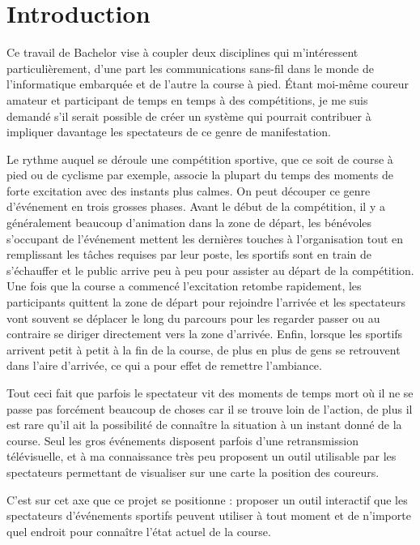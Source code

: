 \chapter{Introduction}

Ce travail de Bachelor vise à coupler deux disciplines qui m’intéressent particulièrement, d’une part les communications sans-fil dans le monde de l’informatique embarquée et de l’autre la course à pied. Étant moi-même coureur amateur et participant de temps en temps à des compétitions, je me suis demandé s’il serait possible de créer un système qui pourrait contribuer à impliquer davantage les spectateurs de ce genre de manifestation.

Le rythme auquel se déroule une compétition sportive, que ce soit de course à pied ou de cyclisme par exemple, associe la plupart du temps des moments de forte excitation avec des instants plus calmes. On peut découper ce genre d’événement en trois grosses phases. Avant le début de la compétition, il y a généralement beaucoup d’animation dans la zone de départ, les bénévoles s’occupant de l’événement mettent les dernières touches à l’organisation tout en remplissant les tâches requises par leur poste, les sportifs sont en train de s’échauffer et le public arrive peu à peu pour assister au départ de la compétition. Une fois que la course a commencé l’excitation retombe rapidement, les participants quittent la zone de départ pour rejoindre l’arrivée et les spectateurs vont souvent se déplacer le long du parcours pour les regarder passer ou au contraire se diriger directement vers la zone d’arrivée. Enfin, lorsque les sportifs arrivent petit à petit à la fin de la course, de plus en plus de gens se retrouvent dans l’aire d’arrivée, ce qui a pour effet de remettre l’ambiance.

Tout ceci fait que parfois le spectateur vit des moments de temps mort où il ne se passe pas forcément beaucoup de choses car il se trouve loin de l'action, de plus il est rare qu’il ait la possibilité de connaître la situation à un instant donné de la course. Seul les gros événements disposent parfois d’une retransmission télévisuelle, et à ma connaissance très peu proposent un outil utilisable par les spectateurs permettant de visualiser sur une carte la position des coureurs.

C’est sur cet axe que ce projet se positionne : proposer un outil interactif que les spectateurs d’événements sportifs peuvent utiliser à tout moment et de n’importe quel endroit pour connaître l’état actuel de la course.
